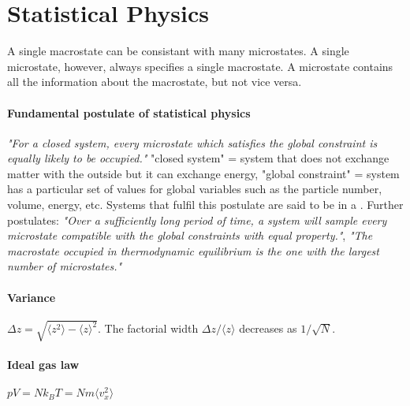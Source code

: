 \section{Statistical Physics}

A single macrostate can be consistant with many microstates. A single microstate,
however, always specifies a single macrostate. A microstate contains all the
information about the macrostate, but not vice versa.

\paragraph{Fundamental postulate of statistical physics}
\textit{"For a closed system, every microstate which satisfies the global constraint is
equally likely to be occupied."} "closed system" = system that does not exchange
matter with the outside but it can exchange energy, "global constraint" = system
has a particular set of values for global variables such as the particle number,
volume, energy, etc. Systems that fulfil this postulate are said to be in a
. Further postulates: \textit{"Over a sufficiently
long period of time, a system will sample every microstate compatible with the
global constraints with equal property."}, \textit{"The macrostate occupied in
thermodynamic equilibrium is the one with the largest number of microstates."}

\paragraph{Variance}
$\Delta z = \sqrt{\langle z^2 \rangle - \langle z \rangle^2}$. 
The factorial width $\Delta z / \langle z \rangle$ decreases as $1/\sqrt{N}$.

\paragraph{Ideal gas law}
$p V = N k_B T = N m \langle v_x^2 \rangle$

